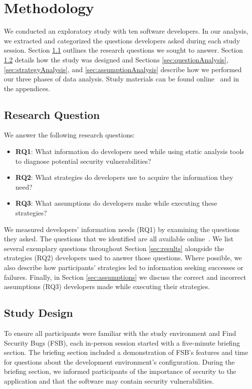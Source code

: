 \documentclass[10pt,journal,compsoc]{IEEEtran}
\begin{document}


\section{Methodology}
\label{sec:meth}
We conducted an exploratory study with ten software developers. In our analysis, we extracted and categorized the questions developers asked during each study session. 
Section \ref{rqs} outlines the research questions we sought to answer. 
Section \ref{studyDesign} details how the study was designed and Sections \ref{sec:questionAnalysis}, \ref{sec:strategyAnalysis}, and \ref{sec:assumptionAnalysis} describe how we performed our three phases of data analysis.
Study materials can be found online~\cite{ExperimentalMaterials} and in the appendices.

\subsection{Research Question}
\label{rqs}
We answer the following research questions:
\begin{itemize}
	\item \textbf{RQ1}: What information do developers need while using static analysis tools to diagnose potential security vulnerabilities? 
	\item \textbf{RQ2}: What strategies do developers use to acquire the information they need?
	\item \textbf{RQ3}: What assumptions do developers make while executing these strategies?
	\end{itemize}
We measured developers' information needs (RQ1) by examining the questions they asked.
The questions that we identified are all available online~\cite{ExperimentalMaterials}.
We list several exemplary questions throughout Section \ref{sec:results} alongside the strategies (RQ2) developers used to answer those questions.
Where possible, we also describe how participants' strategies led to information seeking successes or failures.
Finally, in Section \ref{sec:assumptions} we discuss the correct and incorrect assumptions (RQ3) developers made while executing their strategies. 


\subsection{Study Design}
\label{studyDesign}
To ensure all participants were familiar with the study environment and Find Security Bugs (FSB),
each in-person session started with a five-minute briefing section.
The briefing section included a demonstration of FSB's features and time for questions about the development environment's configuration.
During the briefing section, we informed participants of the importance of security to the application and that the software may contain security vulnerabilities.
\end{document}
